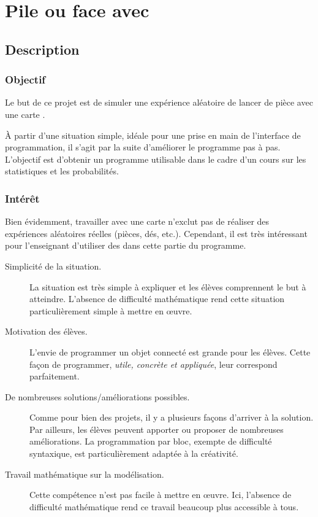 

\section{Pile ou face avec \mb}


\subsection{Description}

\subsubsection{Objectif}

\begin{formule}
Le but de ce projet est de simuler une expérience aléatoire de lancer de pièce avec une carte \mb.

À partir d’une situation simple, idéale pour une prise en main de l’interface de programmation, il s’agit par la suite d’améliorer le programme pas à pas. L’objectif est d’obtenir un programme utilisable dans le cadre d’un cours sur les statistiques et les probabilités.
\end{formule}

\subsubsection{Intérêt}
Bien évidemment, travailler avec une carte \mb n'exclut pas de réaliser des expériences aléatoires réelles (pièces, dés, etc.). Cependant, il est très intéressant pour l'enseignant d'utiliser des \mb dans cette partie du programme.
\begin{description}
    \item [Simplicité de la situation.] La situation est très simple à expliquer et les élèves comprennent le but à atteindre. L'absence de difficulté mathématique rend cette situation particulièrement simple à mettre en œuvre.
    \item [Motivation des élèves.] L'envie de programmer un objet connecté est grande pour les élèves. Cette façon de programmer, \emph{utile, concrète et appliquée}, leur correspond parfaitement.
    \item [De nombreuses solutions/améliorations possibles.] Comme pour bien des projets, il y a plusieurs façons d'arriver à la solution. Par ailleurs, les élèves peuvent apporter ou proposer de nombreuses améliorations. La programmation par bloc, exempte de difficulté syntaxique, est particulièrement adaptée à la créativité.
    \item [Travail mathématique sur la modélisation.] Cette compétence n'est pas facile à mettre en œuvre. Ici, l'absence de difficulté mathématique rend ce travail beaucoup plus accessible à tous.
\end{description}


